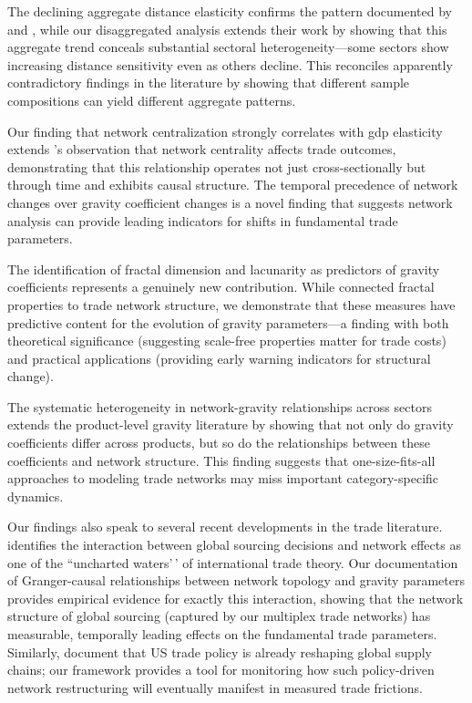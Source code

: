 \documentclass[preprint, 3p,
authoryear]{elsarticle} %
\begin{document}
The declining aggregate distance elasticity confirms the pattern
documented by \citet{brun2005} and \citet{disdier2008}, while our
disaggregated analysis extends their work by showing that this aggregate
trend conceals substantial sectoral heterogeneity---some sectors show
increasing distance sensitivity even as others decline. This reconciles
apparently contradictory findings in the literature
\citep{berthelon2008, yotov2012} by showing that different sample
compositions can yield different aggregate patterns.

Our finding that network centralization strongly correlates with
\gls{gdp} elasticity extends \citet{fagiolo2009}'s observation that
network centrality affects trade outcomes, demonstrating that this
relationship operates not just cross-sectionally but through time and
exhibits causal structure. The temporal precedence of network changes
over gravity coefficient changes is a novel finding that suggests
network analysis can provide leading indicators for shifts in
fundamental trade parameters.

The identification of fractal dimension and lacunarity as predictors of
gravity coefficients represents a genuinely new contribution. While
\citet{garcia2016international} connected fractal properties to trade
network structure, we demonstrate that these measures have predictive
content for the evolution of gravity parameters---a finding with both
theoretical significance (suggesting scale-free properties matter for
trade costs) and practical applications (providing early warning
indicators for structural change).

The systematic heterogeneity in network-gravity relationships across
sectors extends the product-level gravity literature
\citep{baldwinharrigan2011, hummels2005} by showing that not only do
gravity coefficients differ across products, but so do the relationships
between these coefficients and network structure. This finding suggests
that one-size-fits-all approaches to modeling trade networks may miss
important category-specific dynamics.

Our findings also speak to several recent developments in the trade
literature. \citet{antras2025uncharted} identifies the interaction
between global sourcing decisions and network effects as one of the
``uncharted waters'\,' of international trade theory. Our documentation
of Granger-causal relationships between network topology and gravity
parameters provides empirical evidence for exactly this interaction,
showing that the network structure of global sourcing (captured by our
multiplex trade networks) has measurable, temporally leading effects on
the fundamental trade parameters. Similarly, \citet{freund2024supply}
document that US trade policy is already reshaping global supply chains;
our framework provides a tool for monitoring how such policy-driven
network restructuring will eventually manifest in measured trade
frictions.
\end{document}
